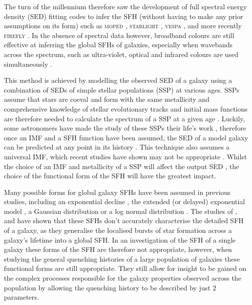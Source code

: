 The turn of the millennium therefore saw the development of full spectral energy density (SED) fitting codes to infer the SFH (without having to make any prior assumptions on its form) such as \textsc{moped} \citep{heavens00}, \textsc{starlight} \citep{cidfernandes05}, \textsc{vespa} \citep{tojeiro07}, and more recently \textsc{firefly} \citep{wilkinson15}. In the absence of spectral data however, broadband colours are still effective at inferring the global SFHs of galaxies, especially when wavebands across the spectrum, such as ultra-violet, optical and infrared colours are used simultaneously \citep{madau98}. 

This method is achieved by modelling the observed SED of a galaxy using a combination of SEDs of simple stellar populations (SSP) at various ages. SSPs assume that stars are coeval and form with the same metallicity and comprehensive knowledge of stellar evolutionary tracks and initial mass functions \citep[IMF;][]{salpeter55, chabrier03} are therefore needed to calculate the spectrum of a SSP at a given age \citep{chen10, kriek10}. Luckily, some astronomers have made the study of these SSPs their life's work \citep[for example]{BC03, Maraston05, vazquez05, CGW09}, therefore once an IMF and a SFH function have been assumed, the SED of a model galaxy can be predicted at any point in its history \citep{chen10}. This technique also assumes a universal IMF, which recent studies have shown may not be appropriate \citep{vandokkum08, conroy12, cappellari12, smithr15}. Whilst the choice of an IMF and metallicity of a SSP will affect the output SED \citep{CGW09, kriek10}, the choice of the functional form of the SFH will have the greatest impact. 

Many possible forms for global galaxy SFHs have been assumed in previous studies, including an exponential decline \citep{tinsley72, gavazzi02, weiner06, Martin07, noeske07, kriek10,  schawinski14, hart16}, the extended (or delayed) exponential model \citep{gavazzi02, oemler13, simha14}, a Gaussian distribution \citep{feuillet16} or a log normal distribution \citep{gladders13, abramson16}. The studies of \cite{lee10}, \cite{boquien14} and \cite{smith15} have shown that these SFHs don't accurately characterise the detailed SFH of a galaxy, as they generalise the localised bursts of star formation across a galaxy's lifetime into a global SFH. In an investigation of the SFH of a single galaxy these forms of the SFH are therefore not appropriate, however, when studying the general quenching histories of a large population of galaxies these functional forms are still appropriate. They still allow for insight to be gained on the complex processes responsible for the galaxy properties observed across the population by allowing the quenching history to be described by just $2$ parameters. 


